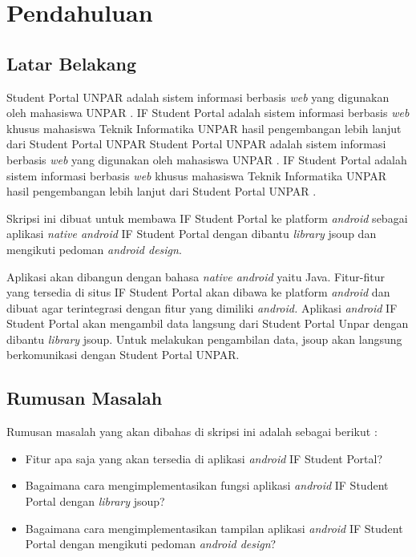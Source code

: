 \chapter{Pendahuluan}
\label{chap:intro}
   
\section{Latar Belakang}
\label{sec:label}

Student Portal UNPAR adalah sistem informasi berbasis \textit{web} yang digunakan oleh mahasiswa UNPAR \cite{studentportalunpar}. IF Student Portal adalah sistem informasi berbasis \textit{web} khusus mahasiswa Teknik Informatika UNPAR hasil pengembangan  lebih lanjut dari Student Portal UNPAR \cite{herfan:15:portal} Student Portal UNPAR adalah sistem informasi berbasis \textit{web} yang digunakan oleh mahasiswa UNPAR \cite{studentportalunpar}. IF Student Portal adalah sistem informasi berbasis \textit{web} khusus mahasiswa Teknik Informatika UNPAR hasil pengembangan  lebih lanjut dari Student Portal UNPAR \cite{herfan:15:portal}. 

Skripsi ini dibuat untuk membawa IF Student Portal ke platform \textit{android} sebagai aplikasi \textit{native android} IF Student Portal dengan dibantu \textit{library} jsoup dan mengikuti pedoman \textit{android design}. 

 Aplikasi akan dibangun dengan bahasa \textit{native android} yaitu Java. Fitur-fitur yang tersedia di situs IF Student Portal akan dibawa ke platform \textit{android} dan dibuat agar terintegrasi dengan fitur yang dimiliki \textit{android.} Aplikasi \textit{android} IF Student Portal akan mengambil data langsung dari Student Portal Unpar dengan dibantu \textit{library} jsoup. Untuk melakukan pengambilan data, jsoup akan langsung berkomunikasi dengan Student Portal UNPAR.  

\section{Rumusan Masalah}
\label{sec:rumusan}
Rumusan masalah yang akan dibahas di skripsi ini adalah sebagai berikut :
\begin{itemize}
    \item Fitur apa saja yang akan tersedia di aplikasi \textit{android} IF Student Portal?
    \item Bagaimana cara mengimplementasikan fungsi aplikasi \textit{android} IF Student Portal dengan \textit{library} jsoup?
    \item Bagaimana cara mengimplementasikan tampilan aplikasi \textit{android} IF Student Portal dengan mengikuti pedoman \textit{android design}?
\end{itemize}

